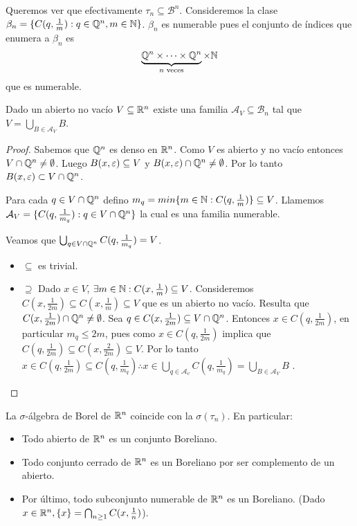 Queremos ver que efectivamente $\tau_n \subseteq \mathcal{B}^n$.
Consideremos la clase $\beta_n = \{ C(q, \frac{1}{m}) : q \in \mathbb{Q}^n, m \in \mathbb{N} \}$.
$\beta_n$ es numerable pues el conjunto de índices que enumera a $\beta_n$ es
\[ \underbrace{\mathbb{Q}^n \times \cdots \times \mathbb{Q}^n}_{n \text{ veces}} \times \mathbb{N} \] que es numerable.

\begin{prop}
    Dado un abierto no vacío $V \subseteq \mathbb{R}^n$ existe una familia $\mathcal{A}_V \subseteq \mathcal{B}_n$ tal que
    $V = \bigcup_{B \in \mathcal{A}_V} B$.

    \begin{proof}
        Sabemos que $\mathbb{Q}^n$ es denso en $\mathbb{R}^n$. Como $V$ es abierto y no vacío entonces $V \cap \mathbb{Q}^n \neq \emptyset$.
        Luego $B(x, \varepsilon) \subseteq V$ y $B(x, \varepsilon) \cap \mathbb{Q}^n \neq \emptyset$. Por lo tanto $B(x, \varepsilon) \subset V \cap \mathbb{Q}^n$.

        Para cada $q \in V \cap \mathbb{Q}^n$ defino $m_q = min\{ m \in \mathbb{N} : C(q, \frac{1}{m}) \} \subseteq V$.
        Llamemos $\mathcal{A}_V = \{ C(q, \frac{1}{m_q}) : q \in V \cap \mathbb{Q}^n \}$ la cual es una familia numerable.
        
        Veamos que $\bigcup_{q \in V \cap \mathbb{Q}^n} C(q, \frac{1}{m_q}) = V$.
        \begin{itemize}
            \item $\subseteq$ es trivial.
            \item $\supseteq$ Dado $x \in V$, $\exists m \in \mathbb{N} : C(x, \frac{1}{m}) \subseteq V$. Consideremos
            $C(x, \frac{1}{2m}) \subseteq C(x, \frac{1}{m}) \subseteq V$ que es un abierto no vacío.
            Resulta que $C(x, \frac{1}{2m}) \cap \mathbb{Q}^n \neq \emptyset$.
            Sea $q \in C(x, \frac{1}{2m}) \subseteq V \cap \mathbb{Q}^n$. Entonces
            $x \in C(q, \frac{1}{2m})$, en particular $m_q \leq 2m$, pues como $x \in C(q, \frac{1}{2m})$
            implica que $C(q, \frac{1}{2m}) \subseteq C(x, \frac{2}{2m}) \subseteq V$.
            Por lo tanto $x \in C(q, \frac{1}{2m}) \subseteq C(q, \frac{1}{m_q}) \therefore x \in \bigcup_{q \in \mathcal{A}_v} C(q, \frac{1}{m_q}) = \bigcup_{B \in \mathcal{A}_V} B$ .
        \end{itemize}
    \end{proof}
\end{prop}

\begin{corollary}
    La $\sigma$-álgebra de Borel de $\mathbb{R}^n$ coincide con la $\sigma(\tau_n)$. En particular:
    \begin{itemize}
        \item Todo abierto de $\mathbb{R}^n$ es un conjunto Boreliano.
        \item Todo conjunto cerrado de $\mathbb{R}^n$ es un Boreliano por ser complemento de un abierto.
        \item Por último, todo subconjunto numerable de $\mathbb{R}^n$ es un Boreliano. (Dado $x \in \mathbb{R}^n, \{ x \} = \bigcap_{n \geq 1}C(x, \frac{1}{n})$).
    \end{itemize}
\end{corollary}

